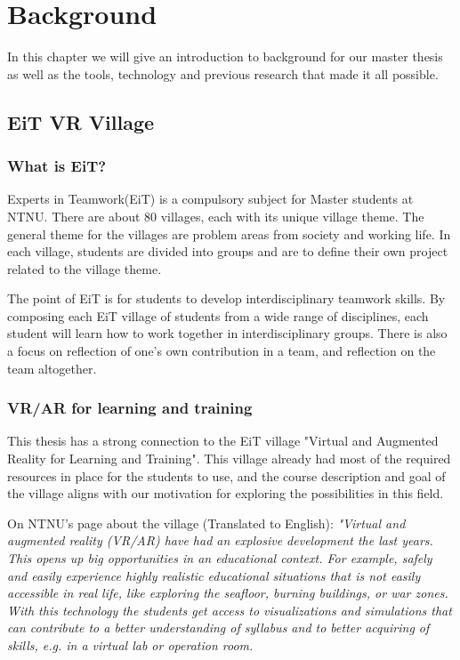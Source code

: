 \chapter{Background}
\label{chap:background}
In this chapter we will give an introduction to background for our master thesis as well as the tools, technology and previous research that made it all possible. 

    \section{EiT VR Village}
        \subsection{What is EiT?}
        Experts in Teamwork(EiT) is a compulsory subject for Master students at NTNU. There are about 80 villages, each with its unique village theme. The general theme for the villages are problem areas from society and working life. In each village, students are divided into groups and are to define their own project related to the village theme.\cite{EiTAbout}
        
        The point of EiT is for students to develop interdisciplinary teamwork skills. By composing each EiT village of students from a wide range of disciplines, each student will learn how to work together in interdisciplinary groups. There is also a focus on reflection of one's own contribution in a team, and reflection on the team altogether.\cite{EiTAbout}
    
        \subsection{VR/AR for learning and training}
        This thesis has a strong connection to the EiT village "Virtual and Augmented Reality for Learning and Training". This village already had most of the required resources in place for the students to use, and the course description and goal of the village aligns with our motivation for exploring the possibilities in this field.
        
        On NTNU's page about the village (Translated to English): \emph{"Virtual and augmented reality (VR/AR) have had an explosive development the last years. This opens up big opportunities in an educational context. For example, safely and easily experience highly realistic educational situations that is not easily accessible in real life, like exploring the seafloor, burning buildings, or war zones. With this technology the students get access to visualizations and simulations that can contribute to a better understanding of syllabus and to better acquiring of skills, e.g. in a virtual lab or operation room.}
        
